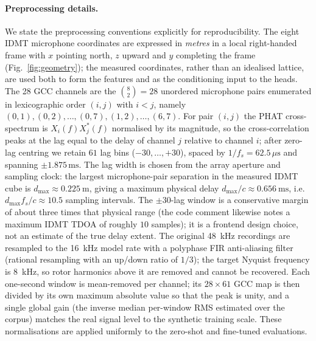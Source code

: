 \documentclass[sensors,article,submit,pdftex,moreauthors]{Definitions/mdpi}
\begin{document}
\paragraph{Preprocessing details.}
We state the preprocessing conventions explicitly for reproducibility. The eight IDMT microphone coordinates are expressed in \emph{metres} in a local right-handed frame with $x$ pointing north, $z$ upward and $y$ completing the frame (Fig.~\ref{fig:geometry}); the measured coordinates, rather than an idealised lattice, are used both to form the features and as the conditioning input to the heads. The 28 GCC channels are the $\binom{8}{2}=28$ unordered microphone pairs enumerated in lexicographic order $(i,j)$ with $i<j$, namely $(0,1),(0,2),\ldots,(0,7),(1,2),\ldots,(6,7)$. For pair $(i,j)$ the PHAT cross-spectrum is $X_i(f)X_j^{*}(f)$ normalised by its magnitude, so the cross-correlation peaks at the lag equal to the delay of channel $j$ relative to channel $i$; after zero-lag centring we retain $61$ lag bins ($-30,\ldots,+30$), spaced by $1/f_s=62.5\,\mu\mathrm{s}$ and spanning $\pm1.875\,\mathrm{ms}$. The lag width is chosen from the array aperture and sampling clock: the largest microphone-pair separation in the measured IDMT cube is $d_{\max}\approx\SI{0.225}{\meter}$, giving a maximum physical delay $d_{\max}/c\approx\SI{0.656}{\milli\second}$, i.e.\ $d_{\max}f_s/c\approx10.5$ sampling intervals. The $\pm30$-lag window is a conservative margin of about three times that physical range (the code comment likewise notes a maximum IDMT TDOA of roughly $10$ samples); it is a frontend design choice, not an estimate of the true delay extent. The original \SI{48}{\kilo\hertz} recordings are resampled to the \SI{16}{\kilo\hertz} model rate with a polyphase FIR anti-aliasing filter (rational resampling with an up/down ratio of $1/3$); the target Nyquist frequency is \SI{8}{\kilo\hertz}, so rotor harmonics above it are removed and cannot be recovered. Each one-second window is mean-removed per channel; its $28\times61$ GCC map is then divided by its own maximum absolute value so that the peak is unity, and a single global gain (the inverse median per-window RMS estimated over the corpus) matches the real signal level to the synthetic training scale. These normalisations are applied uniformly to the zero-shot and fine-tuned evaluations.
\end{document}
